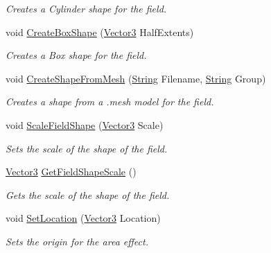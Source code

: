 \begin{DoxyCompactItemize}
\begin{DoxyCompactList}\small\item\em Creates a Cylinder shape for the field. \item\end{DoxyCompactList}\item 
void \hyperlink{classphys_1_1AreaEffect_ada171b33d232988b4a728f816217254d}{CreateBoxShape} (\hyperlink{classphys_1_1Vector3}{Vector3} HalfExtents)
\begin{DoxyCompactList}\small\item\em Creates a Box shape for the field. \item\end{DoxyCompactList}\item 
void \hyperlink{classphys_1_1AreaEffect_a341fb24b93bdd0994ce44ce0be571685}{CreateShapeFromMesh} (\hyperlink{namespacephys_aa03900411993de7fbfec4789bc1d392e}{String} Filename, \hyperlink{namespacephys_aa03900411993de7fbfec4789bc1d392e}{String} Group)
\begin{DoxyCompactList}\small\item\em Creates a shape from a .mesh model for the field. \item\end{DoxyCompactList}\item 
void \hyperlink{classphys_1_1AreaEffect_a0f906c38396ded16978423ad9acc4673}{ScaleFieldShape} (\hyperlink{classphys_1_1Vector3}{Vector3} Scale)
\begin{DoxyCompactList}\small\item\em Sets the scale of the shape of the field. \item\end{DoxyCompactList}\item 
\hyperlink{classphys_1_1Vector3}{Vector3} \hyperlink{classphys_1_1AreaEffect_a251d82e373c6ada5b80c023434e513f6}{GetFieldShapeScale} ()
\begin{DoxyCompactList}\small\item\em Gets the scale of the shape of the field. \item\end{DoxyCompactList}\item 
void \hyperlink{classphys_1_1AreaEffect_aeae24cc1087ad174d406a7a5117d0aed}{SetLocation} (\hyperlink{classphys_1_1Vector3}{Vector3} Location)
\begin{DoxyCompactList}\small\item\em Sets the origin for the area effect. \item\end{DoxyCompactList}\item 

\end{DoxyCompactItemize}
